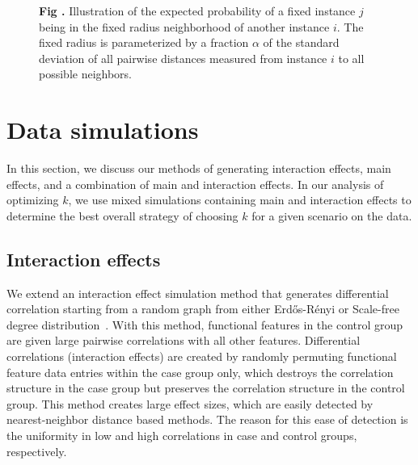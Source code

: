 \documentclass[10pt,letterpaper]{article}
\begin{document}
\begin{figure}[H]
\centering
\begin{minipage}[h]{0.7\textwidth}
\end{minipage}%
\begin{minipage}[h]{0.3\textwidth}
\noindent{}\textbf{Fig \thefigure \label{fig:gaussPlot}.} Illustration of the expected probability of a fixed instance $j$ being in the fixed radius neighborhood of another instance $i$. The fixed radius is parameterized by a fraction $\alpha$ of the standard deviation of all pairwise distances measured from instance $i$ to all possible neighbors.
\end{minipage}
\end{figure} 

\section{Data simulations}\label{sec:sim_methods}
In this section, we discuss our methods of generating interaction effects, main effects, and a combination of main and interaction effects. In our analysis of optimizing $k$, we use mixed simulations containing main and interaction effects to determine the best overall strategy of choosing $k$ for a given scenario on the data.

\subsection{Interaction effects}

We extend an interaction effect simulation method that generates differential correlation starting from a random graph from either Erd\H{o}s-R\'{e}nyi or Scale-free degree distribution~\cite{lareau15}. With this method, functional features in the control group are given large pairwise correlations with all other features. Differential correlations (interaction effects) are created by randomly permuting functional feature data entries within the case group only, which destroys the correlation structure in the case group but preserves the correlation structure in the control group. This method creates large effect sizes, which are easily detected by nearest-neighbor distance based methods. The reason for this ease of detection is the uniformity in low and high correlations in case and control groups, respectively. 
\end{document}

